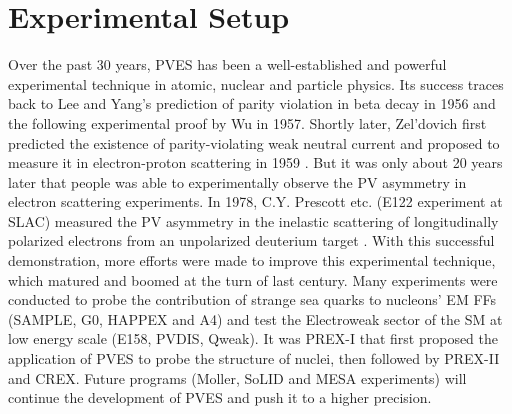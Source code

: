 \chapter{Experimental Setup}
Over the past 30 years, PVES has been a well-established and powerful 
experimental technique in atomic, nuclear and particle physics. Its success 
traces back to Lee and Yang's prediction of parity violation in beta decay in 1956 
and the following experimental proof by Wu in 1957.
Shortly later, Zel'dovich first predicted the existence of parity-violating weak 
neutral current and proposed to measure
it in electron-proton scattering in 1959 \cite{Zeldovich}. But it was only about 
20 years later that people was able to experimentally observe the PV asymmetry 
in electron scattering experiments. 
In 1978, C.Y. Prescott etc. (E122 experiment at SLAC) measured the PV asymmetry in the 
inelastic scattering of longitudinally 
polarized electrons from an unpolarized deuterium target \cite{PRESCOTT1978347}.
With this successful demonstration, more efforts were made to improve this experimental
technique, which matured and boomed at the turn of last century. Many experiments 
were conducted to probe the contribution of strange sea quarks
to nucleons' EM FFs (SAMPLE, G0, HAPPEX and A4) and test the Electroweak 
sector of the SM at low energy scale (E158, PVDIS, Qweak).
It was PREX-I that first proposed the application of PVES to probe the structure
of nuclei, then followed by PREX-II and CREX. Future programs (M\/oller, SoLID 
and MESA experiments) will continue the development of PVES and push it to a
higher precision.

